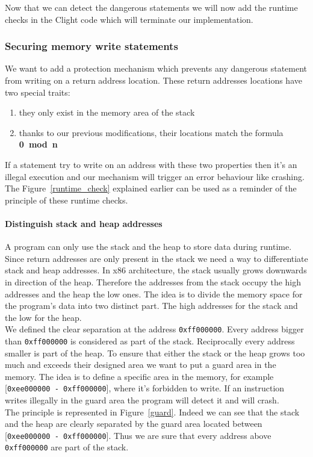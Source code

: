 \documentclass[11pt]{sdm}
\begin{document}
Now that we can detect the dangerous statements we will now add the runtime checks in the Clight code which will terminate our implementation.

\subsubsection{Securing memory write statements}
\label{ssub:implem_check_address}
We want to add a protection mechanism which prevents any dangerous statement from writing on a return address location. These return addresses locations have two special traits:
\begin{enumerate}
	\item they only exist in the memory area of the stack
	\item thanks to our previous modifications, their locations match the formula \textbf{0~mod~n}
\end{enumerate}
If a statement try to write on an address with these two properties then it's an illegal execution and our mechanism will trigger an error behaviour like crashing. The Figure~\ref{runtime_check} explained earlier can be used as a reminder of the principle of these runtime checks.

\paragraph{Distinguish stack and heap addresses}
\label{par:Distinguish stack or heap}
A program can only use the stack and the heap to store data during runtime. Since return addresses are only present in the stack we need a way to differentiate stack and heap addresses.
In x86 architecture, the stack usually grows downwards in direction of the heap. Therefore the addresses from the stack occupy the high addresses and the heap the low ones. 
The idea is to divide the memory space for the program's data into two distinct part. The high addresses for the stack and the low for the heap. \\
We defined the clear separation at the address \texttt{0xff000000}. Every address bigger than \texttt{0xff000000} is considered as part of the stack. Reciprocally every address smaller is part of the heap.
To ensure that either the stack or the heap grows too much and exceeds their designed area we want to put a guard area in the memory. The idea is to define a specific area in the memory, for example [\texttt{0xee000000 - \texttt{0xff000000}}], where it's forbidden to write. If an instruction writes illegally in the guard area the program will detect it and will crash.\\
The principle is represented in Figure~\ref{guard}. Indeed we can see that the stack and the heap are clearly separated by the guard area located between [\texttt{0xee000000 - \texttt{0xff000000}}]. Thus we are sure that every address above \texttt{0xff000000} are part of the stack.
\end{document}
